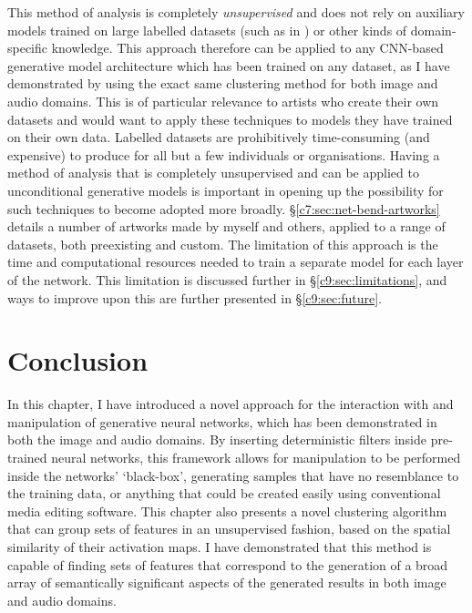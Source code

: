 This method of analysis is completely \emph{unsupervised} and does not rely on auxiliary models trained on large labelled datasets (such as in \citep{Bau2018-td, isola2017image, park2019semantic}) or other kinds of domain-specific knowledge. 
This approach therefore can be applied to any CNN-based generative model architecture which has been trained on any dataset, as I have demonstrated by using the exact same clustering method for both image and audio domains. 
This is of particular relevance to artists who create their own datasets and would want to apply these techniques to models they have trained on their own data. 
Labelled datasets are prohibitively time-consuming (and expensive) to produce for all but a few individuals or organisations. 
Having a method of analysis that is completely unsupervised and can be applied to unconditional generative models is important in opening up the possibility for such techniques to become adopted more broadly.
\S \ref{c7:sec:net-bend-artworks} details a number of artworks made by myself and others, applied to a range of datasets, both preexisting and custom.
The limitation of this approach is the time and computational resources needed to train a separate model for each layer of the network.
This limitation is discussed further in \S \ref{c9:sec:limitations}, and ways to improve upon this are further presented in \S \ref{c9:sec:future}.


\section{Conclusion}

In this chapter, I have introduced a novel approach for the interaction with and manipulation of generative neural networks, which has been demonstrated in both the image and audio domains. 
By inserting deterministic filters inside pre-trained neural networks, this framework allows for manipulation to be performed inside the networks' `black-box', generating samples that have no resemblance to the training data, or anything that could be created easily using conventional media editing software. 
This chapter also presents a novel clustering algorithm that can group sets of features in an unsupervised fashion, based on the spatial similarity of their activation maps. 
I have demonstrated that this method is capable of finding sets of features that correspond to the generation of a broad array of semantically significant aspects of the generated results in both image and audio domains. 

